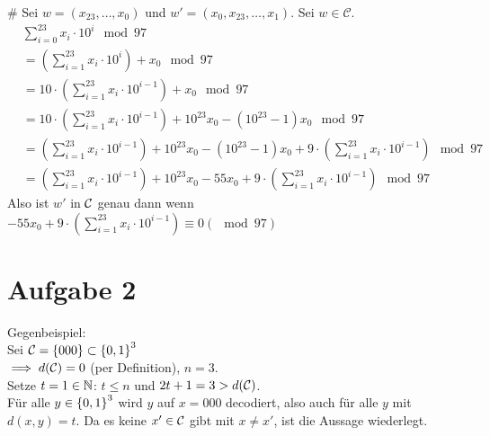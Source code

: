\begin{myList}
#
Sei $w = (x_{23}, \ldots , x_0)$ und $w' = (x_0, x_{23}, \ldots, x_1)$.
Sei $w \in \mathcal{C}$.
\begin{align*}
	&\sum_{i=0}^{23} x_i \cdot 10^i \mod 97 \\
	&= \left(\sum_{i=1}^{23} x_i \cdot 10^i\right) + x_0  \mod 97\\
	&= 10 \cdot \left(\sum_{i=1}^{23} x_i \cdot 10^{i-1}\right) + x_0 \mod 97 \\
	&= 10 \cdot \left(\sum_{i=1}^{23} x_i \cdot 10^{i-1}\right) + 10^{23}x_0 - (10^{23} -1) x_0 \mod 97 \\
	&= \left(\sum_{i=1}^{23} x_i \cdot 10^{i-1}\right) + 10^{23}x_0 - (10^{23} -1) x_0 + 9 \cdot \left(\sum_{i=1}^{23} x_i \cdot 10^{i-1}\right) \mod 97 \\
	&= \left(\sum_{i=1}^{23} x_i \cdot 10^{i-1}\right) + 10^{23}x_0 - 55 x_0 + 9 \cdot \left(\sum_{i=1}^{23} x_i \cdot 10^{i-1}\right) \mod 97
\end{align*}
Also ist $w'$ in $\mathcal{C}$ genau dann wenn $- 55 x_0 + 9 \cdot \left(\sum_{i=1}^{23} x_i \cdot 10^{i-1}\right) \equiv 0 (\mod 97)$
\end{myList}
\section*{Aufgabe 2}
Gegenbeispiel:\\
Sei $\mathcal{C} = \left\lbrace 000 \right\rbrace\subset\left\lbrace 0, 1 \right\rbrace^3$\\
$\implies d(\mathcal{C})=0$ (per Definition), $n=3$.\\
Setze $t=1\in\mathbb{N}$: $t\leq n$ und $2t+1=3>d(\mathcal{C})$.\\
Für alle $y\in \left\lbrace 0, 1 \right\rbrace^3$ wird $y$ auf $x=000$ decodiert, also auch für alle $y$ mit $d(x, y)=t$. Da es keine $x'\in\mathcal{C}$ gibt mit $x\not= x'$, ist die Aussage wiederlegt.

